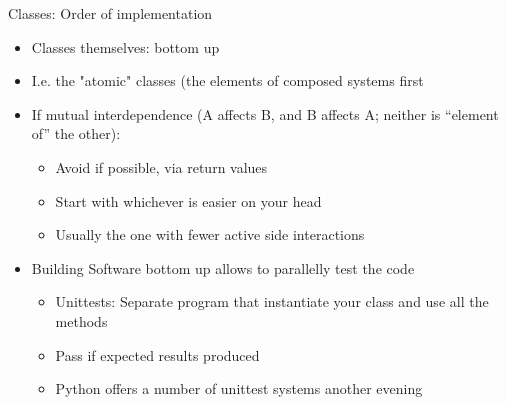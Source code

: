 \begin{frame}{Classes: Order of implementation}
%
\begin{itemize}
\item Classes themselves: bottom up
\item I.\;e. the "atomic" classes (the elements of composed systems first
\item If mutual interdependence (A affects B, and B affects A; neither is \enquote{element of} the other):
	\begin{itemize}
	\item Avoid if possible, \zB via return values
	\item Start with whichever is easier on your head
	\item Usually the one with fewer active side interactions
	\end{itemize}
\item Building Software bottom up allows to parallelly test the code
	\begin{itemize}
	\item Unittests: Separate program that instantiate your class and use all the methods
	\item Pass if expected results produced
	\item Python offers a number of unittest systems \Thus another evening
	\end{itemize}
\end{itemize}
%
\end{frame}
